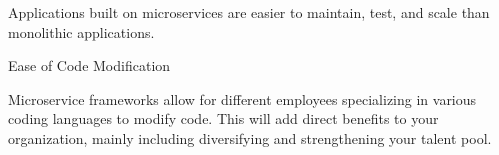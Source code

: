 Applications built on microservices are easier to maintain, test, and scale than monolithic applications.

Ease of Code Modification

Microservice frameworks allow for different employees specializing in various coding languages to modify code. This will add direct benefits to your organization, mainly including diversifying and strengthening your talent pool.

